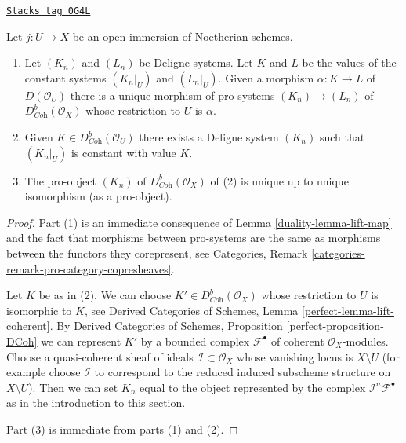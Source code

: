 \begin{lemma}
\label{duality-lemma-extension-by-zero}
\href{https://stacks.math.columbia.edu/tag/0G4L}{\texttt{Stacks tag 0G4L}}

Let $j : U \to X$ be an open immersion of Noetherian schemes.
\begin{enumerate}
\item Let $(K_n)$ and $(L_n)$ be Deligne systems.
Let $K$ and $L$ be the values of the constant systems
$(K_n|_U)$ and $(L_n|_U)$. Given a morphism $\alpha : K \to L$
of $D(\mathcal{O}_U)$
there is a unique morphism of pro-systems $(K_n) \to (L_n)$
of $D^b_{\textit{Coh}}(\mathcal{O}_X)$ whose restriction to $U$ is $\alpha$.
\item Given $K \in D^b_{\textit{Coh}}(\mathcal{O}_U)$ there exists a
Deligne system $(K_n)$ such that $(K_n|_U)$ is constant
with value $K$.
\item The pro-object $(K_n)$ of $D^b_{\textit{Coh}}(\mathcal{O}_X)$
of (2) is unique up to unique isomorphism (as a pro-object).
\end{enumerate}
\end{lemma}

\begin{proof}

Part (1) is an immediate consequence of Lemma \ref{duality-lemma-lift-map}
and the fact that morphisms between pro-systems are
the same as morphisms between the functors they corepresent, see
Categories, Remark \ref{categories-remark-pro-category-copresheaves}.

\medskip\noindent
Let $K$ be as in (2). We can choose $K' \in D^b_{\textit{Coh}}(\mathcal{O}_X)$
whose restriction to $U$ is isomorphic to $K$, see
Derived Categories of Schemes, Lemma \ref{perfect-lemma-lift-coherent}.
By Derived Categories of Schemes, Proposition \ref{perfect-proposition-DCoh}
we can represent $K'$ by a bounded complex $\mathcal{F}^\bullet$
of coherent $\mathcal{O}_X$-modules. Choose a quasi-coherent sheaf
of ideals $\mathcal{I} \subset \mathcal{O}_X$ whose vanishing
locus is $X \setminus U$ (for example choose $\mathcal{I}$ to correspond
to the reduced induced subscheme structure on $X \setminus U$).
Then we can set $K_n$ equal to the object represented by the complex
$\mathcal{I}^n\mathcal{F}^\bullet$ as in the introduction
to this section.

\medskip\noindent
Part (3) is immediate from parts (1) and (2).
\end{proof}

